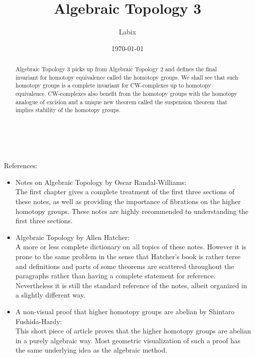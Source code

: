 \documentclass[a4paper]{article}
\title{Algebraic Topology 3}
\author{Labix}
\date{\today}
\begin{document}
\maketitle
\begin{abstract}
Algebraic Topology 3 picks up from Algebraic Topology 2 and defines the final invariant for homotopy equivalence called the homotopy groups. We shall see that such homotopy groups is a complete invariant for CW-complexes up to homotopy equivalence. CW-complexes also benefit from the homotopy groups with the homotopy analogue of excision and a unique new theorem called the suspension theorem that implies stability of the homotopy groups. 
\end{abstract}
~\\~\\
References: 
\begin{itemize}
\item Notes on Algebraic Topology by Oscar Randal-Williams: \\
The first chapter gives a complete treatment of the first three sections of these notes, as well as providing the importance of fibrations on the higher homotopy groups. These notes are highly recommended to understanding the first three sections. 

\item Algebraic Topology by Allen Hatcher: \\
A more or less complete dictionary on all topics of these notes. However it is prone to the same problem in the sense that Hatcher's book is rather terse and definitions and parts of some theorems are scattered throughout the paragraphs rather than having a complete statement for reference. Nevertheless it is still the standard reference of the notes, albeit organized in a slightly different way. 

\item A non-visual proof that higher homotopy groups are abelian by Shintaro Fushida-Hardy: \\
This short piece of article proves that the higher homotopy groups are abelian in a purely algebraic way. Most geometric visualization of such a proof has the same underlying idea as the algebraic method. 
\end{itemize}

\pagebreak
\tableofcontents

\pagebreak
\end{document}
